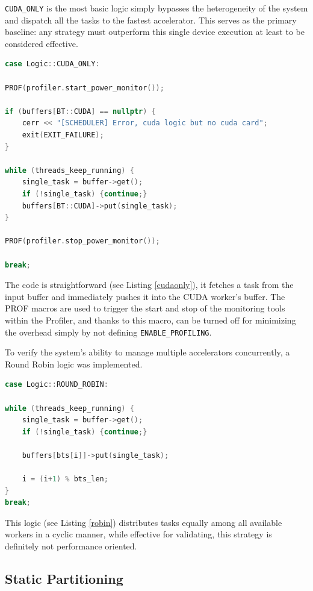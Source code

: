 \texttt{CUDA\_ONLY} is the most basic logic simply bypasses the heterogeneity of the system and dispatch all the tasks to the fastest accelerator. This serves as the primary baseline: any strategy must outperform this single device execution at least to be considered effective. 

\begin{lstlisting}[caption={CUDA Only Logic}, language=C++, label={cudaonly}] 
case Logic::CUDA_ONLY:

PROF(profiler.start_power_monitor());

if (buffers[BT::CUDA] == nullptr) {
    cerr << "[SCHEDULER] Error, cuda logic but no cuda card";
    exit(EXIT_FAILURE);
}

while (threads_keep_running) { 
    single_task = buffer->get();
    if (!single_task) {continue;} 
    buffers[BT::CUDA]->put(single_task);
} 

PROF(profiler.stop_power_monitor());

break;
\end{lstlisting}

The code is straightforward (see Listing \ref{cudaonly}), it fetches a task from the input buffer and immediately pushes it into the CUDA worker's buffer. The PROF macros are used to trigger the start and stop of the monitoring tools within the Profiler, and thanks to this macro, can be turned off for minimizing the overhead simply by not defining \texttt{ENABLE\_PROFILING}.

To verify the system's ability to manage multiple accelerators concurrently, a Round Robin logic was implemented.

\begin{lstlisting}[caption={Round Robin Logic}, language=C++, label={robin}] 
case Logic::ROUND_ROBIN: 

while (threads_keep_running) { 
    single_task = buffer->get();
    if (!single_task) {continue;} 

    buffers[bts[i]]->put(single_task);

    i = (i+1) % bts_len;
} 
break;
\end{lstlisting}

This logic (see Listing \ref{robin}) distributes tasks equally among all available workers in a cyclic manner, while effective for validating, this strategy is definitely not performance oriented.

\subsection{Static Partitioning}
\label{implstaticlogic}

